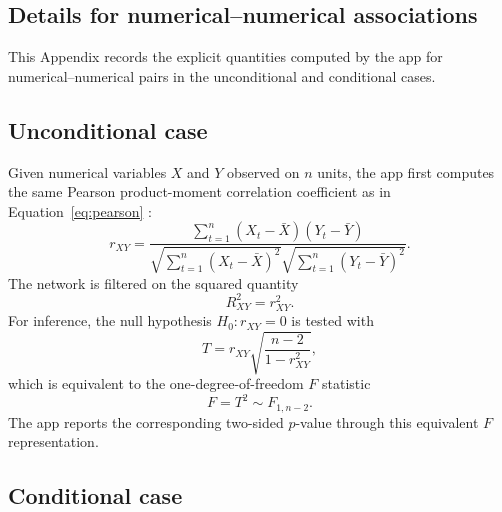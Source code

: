 \documentclass[11pt]{article}
\begin{document}
\begin{appendix}

\renewenvironment{equation}{\begin{equation*}}{\end{equation*}}
\renewenvironment{align}{\begin{align*}}{\end{align*}}

\section{Details for numerical--numerical associations}
\label{app:numnum}

This Appendix records the explicit quantities computed by the app for
numerical--numerical pairs in the unconditional and conditional cases.

\subsection{Unconditional case}

Given numerical variables $X$ and $Y$ observed on $n$ units, the app first
computes the same Pearson product-moment correlation coefficient as in
Equation~\eqref{eq:pearson} \citep{Pearson1896}:
\begin{equation}
r_{XY}
=
\frac{
\sum_{t=1}^{n}(X_t - \bar{X})(Y_t - \bar{Y})
}{
\sqrt{\sum_{t=1}^{n}(X_t - \bar{X})^2}
\sqrt{\sum_{t=1}^{n}(Y_t - \bar{Y})^2}
}.
\label{eq:app-pearson}
\end{equation}
The network is filtered on the squared quantity
\begin{equation}
R^2_{XY} = r_{XY}^2.
\label{eq:app-r2}
\end{equation}
For inference, the null hypothesis $H_0: r_{XY} = 0$ is tested with
\begin{equation}
T
=
r_{XY}\sqrt{\frac{n-2}{1-r_{XY}^2}},
\label{eq:app-t-pearson}
\end{equation}
which is equivalent to the one-degree-of-freedom $F$ statistic
\begin{equation}
F = T^2 \sim F_{1,n-2}.
\label{eq:app-f-pearson}
\end{equation}
The app reports the corresponding two-sided $p$-value through this equivalent
$F$ representation.

\subsection{Conditional case}


\end{appendix}
\end{document}
